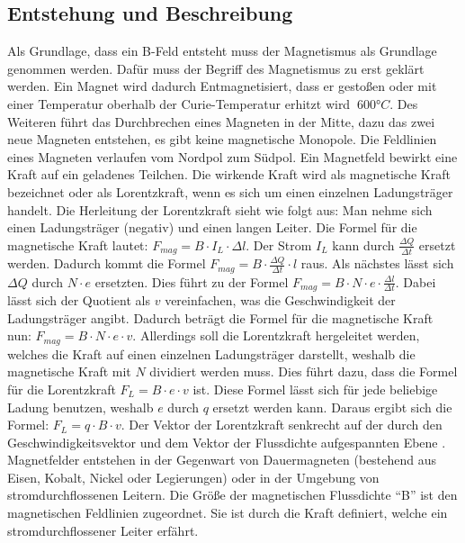 \subsection{Entstehung und Beschreibung}
Als Grundlage, dass ein B-Feld entsteht muss der Magnetismus als Grundlage genommen werden.
Dafür muss der Begriff des Magnetismus zu erst geklärt werden.
Ein Magnet wird dadurch Entmagnetisiert, dass er gestoßen oder mit einer Temperatur oberhalb der Curie-Temperatur erhitzt wird $~600°C$.
Des Weiteren führt das Durchbrechen eines Magneten in der Mitte, dazu das zwei neue Magneten entstehen, es gibt keine magnetische Monopole.
Die Feldlinien eines Magneten verlaufen vom Nordpol zum Südpol.
Ein Magnetfeld bewirkt eine Kraft auf ein geladenes Teilchen.
Die wirkende Kraft wird als magnetische Kraft bezeichnet oder als Lorentzkraft, wenn es sich um einen einzelnen Ladungsträger handelt.
Die Herleitung der Lorentzkraft sieht wie folgt aus:
Man nehme sich einen Ladungsträger (negativ) und einen langen Leiter.
Die Formel für die magnetische Kraft lautet: $F_{mag} =  B \cdot I_L \cdot \Delta l$.
Der Strom $I_L$ kann durch $\frac{\Delta Q}{\Delta t}$ ersetzt werden.
Dadurch kommt die Formel $F_{mag} = B \cdot \frac{\Delta Q}{\Delta t} \cdot l$ raus. 
Als nächstes lässt sich $\Delta Q$ durch $N \cdot e$ ersetzten.
Dies führt zu der Formel $F_{mag} = B \cdot N \cdot e \cdot \frac{\Delta l}{\Delta t}$.
Dabei lässt sich der Quotient als $v$ vereinfachen, was die Geschwindigkeit der Ladungsträger angibt.
Dadurch beträgt die Formel für die magnetische Kraft nun: $F_{mag} = B \cdot N \cdot e \cdot v$.
Allerdings soll die Lorentzkraft hergeleitet werden, welches die Kraft auf einen einzelnen Ladungsträger darstellt, weshalb die magnetische Kraft mit $N$ dividiert werden muss.
Dies führt dazu, dass die Formel für die Lorentzkraft $F_L = B \cdot e \cdot v$ ist.
Diese Formel lässt sich für jede beliebige Ladung benutzen, weshalb $e$ durch $q$ ersetzt werden kann.
Daraus ergibt sich die Formel: $F_L = q \cdot B \cdot v$.
Der Vektor der Lorentzkraft senkrecht auf der durch den Geschwindigkeitsvektor und dem Vektor der Flussdichte aufgespannten Ebene \cite{Lorentzkraft}.
Magnetfelder entstehen in der Gegenwart von Dauermagneten (bestehend aus Eisen, Kobalt, Nickel oder Legierungen) oder in der Umgebung von stromdurchflossenen Leitern. 
Die Größe der magnetischen Flussdichte "`B"' ist den magnetischen Feldlinien zugeordnet.
Sie ist durch die Kraft definiert, welche ein stromdurchflossener Leiter erfährt.

